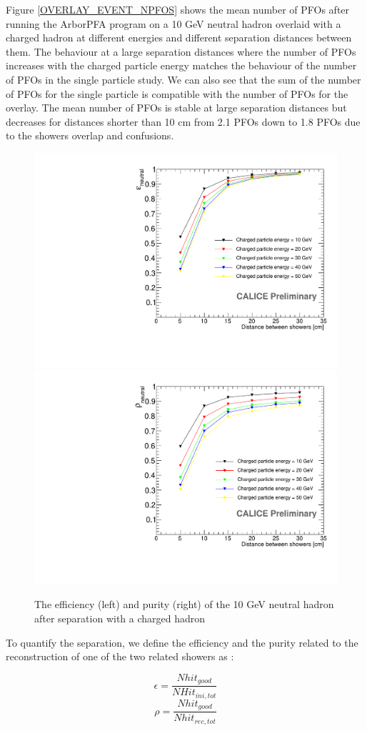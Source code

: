 \documentclass[cits]{JINST}
\begin{document}
Figure \ref{OVERLAY_EVENT_NPFOS} shows the mean number of PFOs after running the ArborPFA program on a 10 GeV neutral hadron overlaid with a charged hadron at different energies and different separation distances between them. The behaviour at a large separation distances where the number of PFOs increases with the charged particle energy matches the behaviour of the number of PFOs in the single particle study. We can also see that the sum of the number of PFOs for the single particle is compatible with the number of PFOs for the overlay. The mean number of PFOs is stable at large separation distances but decreases for distances shorter than 10 cm from 2.1 PFOs down to 1.8 PFOs due to the showers overlap and confusions.

\begin{figure}[!h]
  \begin{center}
    \includegraphics[width=0.47\linewidth]{plots/OverlayEvent_NeutralEfficiency.pdf}
    \includegraphics[width=0.47\linewidth]{plots/OverlayEvent_NeutralPurity.pdf}
  \end{center}
  \caption{\label{OVERLAY_EVENT_PURITY_EFFICIENCY} The efficiency (left) and purity (right) of the 10 GeV neutral hadron after separation with a charged hadron}
\end{figure}


To quantify the separation, we define the efficiency and the purity related to the reconstruction of one of the two related showers as :

\begin{equation}
  \epsilon = \frac{Nhit_{good}}{NHit_{ini,tot}}
\end{equation}
\begin{equation}
  \rho = \frac{Nhit_{good}}{Nhit_{rec,tot}}
\end{equation}
\end{document}
